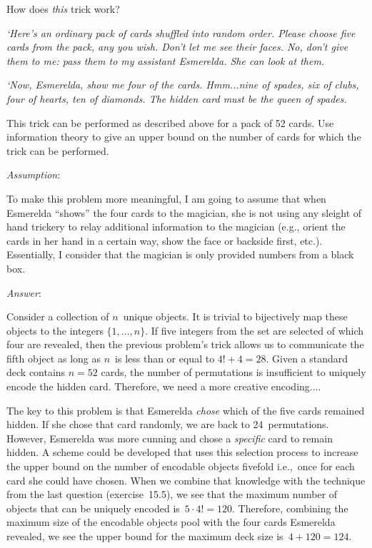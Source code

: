 \begin{problem}{15}{6}
  How does \textit{this} trick work?

  \begin{addmargin}[0.1in]{0.1in}
    \textnormal{\textit{`Here's an ordinary pack of cards shuffled into random order.  Please choose five cards from the pack, any you wish. Don't let me see their faces. No, don't give them to me: pass them to my assistant Esmerelda.  She can look at them.}}

    \textnormal{\textit{`Now, Esmerelda, show me four of the cards.  Hmm...nine of spades, six of clubs, four of hearts, ten of diamonds. The hidden card must be the queen of spades.}}
  \end{addmargin}

  This trick can be performed as described above for a pack of 52 cards.  Use information theory to give an upper bound on the number of cards for which the trick can be performed.
\end{problem}

\noindent
\textit{Assumption}:

To make this problem more meaningful, I am going to assume that when Esmerelda ``shows'' the four cards to the magician, she is not using any sleight of hand trickery to relay additional information to the magician (e.g., orient the cards in her hand in a certain way, show the face or backside first, etc.).  Essentially, I consider that the magician is only provided numbers from a black box.

\noindent
\textit{Answer}:

Consider a collection of $n$~unique objects.  It is trivial to bijectively map these objects to the integers $\{1,\ldots,n\}$. If five integers from the set are selected of which four are revealed, then the previous problem's trick allows us to communicate the fifth object as long as $n$~is less than or equal to ${4! + 4 = 28}$.  Given a standard deck contains ${n=52}$ cards, the number of permutations is insufficient to uniquely encode the hidden card.  Therefore, we need a more creative encoding....

The key to this problem is that Esmerelda \textit{chose} which of the five cards remained hidden.  If she chose that card randomly, we are back to 24~permutations.  However, Esmerelda was more cunning and chose a \textit{specific} card to remain hidden.  A scheme could be developed that uses this selection process to increase the upper bound on the number of encodable objects fivefold i.e.,~once for each card she could have chosen.  When we combine that knowledge with the technique from the last question (exercise~15.5), we see that the maximum number of objects that can be uniquely encoded is~${5\cdot4!=120}$.  Therefore, combining the maximum size of the encodable objects pool with the four cards Esmerelda revealed, we see the upper bound for the maximum deck size is~${4 + 120 = \boxed{124}}$.

